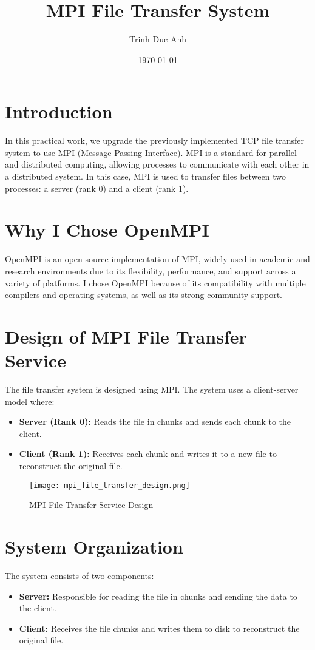 \documentclass{article}
\title{MPI File Transfer System}
\author{Trinh Duc Anh}
\date{\today}
\begin{document}
\maketitle

\section{Introduction}
In this practical work, we upgrade the previously implemented TCP file transfer system to use MPI (Message Passing Interface). MPI is a standard for parallel and distributed computing, allowing processes to communicate with each other in a distributed system. In this case, MPI is used to transfer files between two processes: a server (rank 0) and a client (rank 1).

\section{Why I Chose OpenMPI}
OpenMPI is an open-source implementation of MPI, widely used in academic and research environments due to its flexibility, performance, and support across a variety of platforms. I chose OpenMPI because of its compatibility with multiple compilers and operating systems, as well as its strong community support.

\section{Design of MPI File Transfer Service}
The file transfer system is designed using MPI. The system uses a client-server model where:
\begin{itemize}
    \item \textbf{Server (Rank 0):} Reads the file in chunks and sends each chunk to the client.
    \item \textbf{Client (Rank 1):} Receives each chunk and writes it to a new file to reconstruct the original file.
\end{itemize}

\begin{figure}[h!]
\centering
\texttt{[image: mpi\_file\_transfer\_design.png]}
\caption{MPI File Transfer Service Design}
\end{figure}

\section{System Organization}
The system consists of two components:
\begin{itemize}
    \item \textbf{Server:} Responsible for reading the file in chunks and sending the data to the client.
    \item \textbf{Client:} Receives the file chunks and writes them to disk to reconstruct the original file.
\end{itemize}
\end{document}
